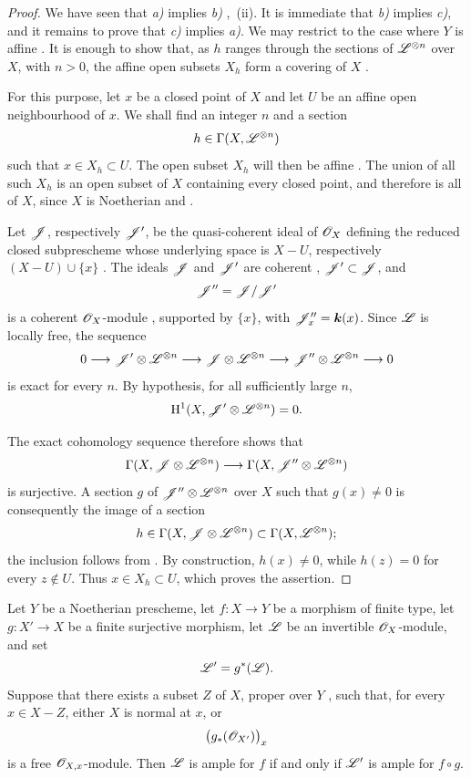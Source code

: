 \begin{proof}
We have seen that \emph{a)} implies \emph{b)} ,~(ii).
It is immediate that \emph{b)} implies \emph{c)}, and it remains to prove
that \emph{c)} implies \emph{a)}.
We may restrict to the case where $Y$ is affine .
It is enough to show that, as $h$ ranges through the sections of
$\mathscr{L}^{\otimes n}$ over $X$, with $n>0$, the affine open subsets $X_h$
form a covering of $X$ .

For this purpose, let $x$ be a closed point of $X$ and let $U$ be an
affine open neighbourhood of $x$.
We shall find an integer $n$ and a section
\[
  h\in\Gamma(X,\mathscr{L}^{\otimes n})
\]
such that $x\in X_h\subset U$.
The open subset $X_h$ will then be affine .
The union of all such $X_h$ is an open subset of $X$ containing every
closed point, and therefore is all of $X$, since $X$ is Noetherian
 and .

Let $\mathscr{J}$, respectively $\mathscr{J}'$, be the quasi-coherent ideal of
$\mathscr{O}_X$ defining the reduced closed subprescheme whose underlying
space is $X-U$, respectively $(X-U)\cup\{x\}$ .
The ideals $\mathscr{J}$ and $\mathscr{J}'$ are coherent ,
$\mathscr{J}'\subset\mathscr{J}$, and
\[
  \mathscr{J}''=\mathscr{J}/\mathscr{J}'
\]
is a coherent $\mathscr{O}_X$-module , supported by
$\{x\}$, with $\mathscr{J}''_x=\boldsymbol{k}(x)$.
Since $\mathscr{L}$ is locally free, the sequence
\[
  0\longrightarrow
  \mathscr{J}'\otimes\mathscr{L}^{\otimes n}
  \longrightarrow
  \mathscr{J}\otimes\mathscr{L}^{\otimes n}
  \longrightarrow
  \mathscr{J}''\otimes\mathscr{L}^{\otimes n}
  \longrightarrow0
\]
is exact for every $n$.
By hypothesis, for all sufficiently large $n$,
\[
  \mathrm{H}^1(X,\mathscr{J}'\otimes\mathscr{L}^{\otimes n})=0.
\]


The exact cohomology sequence therefore shows that
\[
  \Gamma(X,\mathscr{J}\otimes\mathscr{L}^{\otimes n})
  \longrightarrow
  \Gamma(X,\mathscr{J}''\otimes\mathscr{L}^{\otimes n})
\]
is surjective.
A section $g$ of $\mathscr{J}''\otimes\mathscr{L}^{\otimes n}$ over $X$ such that
$g(x)\neq0$ is consequently the image of a section
\[
  h\in\Gamma(X,\mathscr{J}\otimes\mathscr{L}^{\otimes n})
  \subset\Gamma(X,\mathscr{L}^{\otimes n});
\]
the inclusion follows from .
By construction, $h(x)\neq0$, while $h(z)=0$ for every $z\notin U$.
Thus $x\in X_h\subset U$, which proves the assertion.
\end{proof}

\begin{proposition}[2.6.2]
\label{III.2.6.2}
Let $Y$ be a Noetherian prescheme, let $f:X\to Y$ be a morphism of
finite type, let $g:X'\to X$ be a finite surjective morphism, let
$\mathscr{L}$ be an invertible $\mathscr{O}_X$-module, and set
\[
  \mathscr{L}'=g^*(\mathscr{L}).
\]
Suppose that there exists a subset $Z$ of $X$, proper over $Y$
, such that, for every $x\in X-Z$, either $X$ is
normal at $x$, or
\[
  \bigl(g_*(\mathscr{O}_{X'})\bigr)_x
\]
is a free $\mathscr{O}_{X,x}$-module.
Then $\mathscr{L}$ is ample for $f$ if and only if $\mathscr{L}'$ is ample for
$f\circ g$.
\end{proposition}

